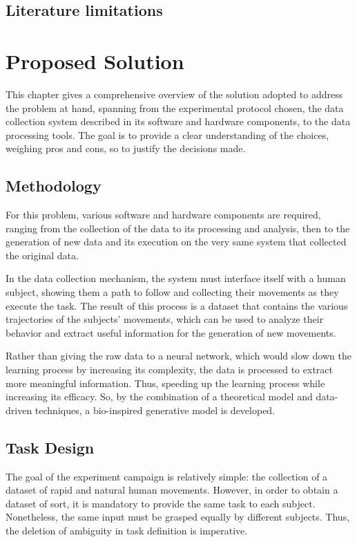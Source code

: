 \documentclass[12pt]{report}
\begin{document}
\section{Literature limitations}

\chapter{Proposed Solution}
This chapter gives a comprehensive overview of the solution adopted to address the problem at hand, spanning from the experimental protocol chosen, the data collection system described in its software and hardware components, to the data processing tools. The goal is to provide a clear understanding of the choices, weighing pros and cons, so to justify the decisions made.
\section{Methodology}
For this problem, various software and hardware components are required, ranging from the collection of the data to its processing and analysis, then to the generation of new data and its execution on the very same system that collected the original data. 

In the data collection mechanism, the system must interface itself with a human subject, showing them a path to follow and collecting their movements as they execute the task. The result of this process is a dataset that contains the various trajectories of the subjects' movements, which can be used to analyze their behavior and extract useful information for the generation of new movements.

Rather than giving the raw data to a neural network, which would slow down the learning process by increasing its complexity, the data is processed to extract more meaningful information. Thus, speeding up the learning process while increasing its efficacy. So, by the combination of a theoretical model and data-driven techniques, a bio-inspired generative model is developed. 

\section{Task Design}
The goal of the experiment campaign is relatively simple: the collection of a dataset of rapid and natural human movements. However, in order to obtain a dataset of sort, it is mandatory to provide the same task to each subject. Nonetheless, the same input must be grasped equally by different subjects. Thus, the deletion of ambiguity in task definition is imperative.
\end{document}
